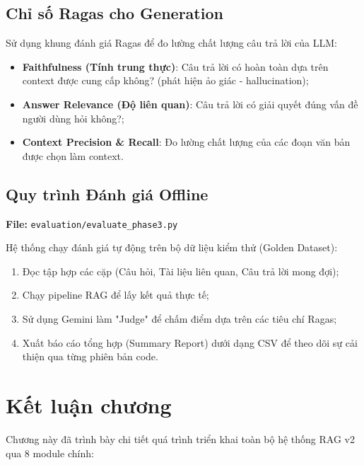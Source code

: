\documentclass[../DoAn.tex]{subfiles}
\begin{document}
\subsection{Chỉ số Ragas cho Generation}
Sử dụng khung đánh giá Ragas để đo lường chất lượng câu trả lời của LLM:
\begin{itemize}
    \item \textbf{Faithfulness (Tính trung thực)}: Câu trả lời có hoàn toàn dựa trên context được cung cấp không? (phát hiện ảo giác - hallucination);
    \item \textbf{Answer Relevance (Độ liên quan)}: Câu trả lời có giải quyết đúng vấn đề người dùng hỏi không?;
    \item \textbf{Context Precision \& Recall}: Đo lường chất lượng của các đoạn văn bản được chọn làm context.
\end{itemize}

\subsection{Quy trình Đánh giá Offline}
\textbf{File:} \texttt{evaluation/evaluate_phase3.py}

Hệ thống chạy đánh giá tự động trên bộ dữ liệu kiểm thử (Golden Dataset):
\begin{enumerate}
    \item Đọc tập hợp các cặp (Câu hỏi, Tài liệu liên quan, Câu trả lời mong đợi);
    \item Chạy pipeline RAG để lấy kết quả thực tế;
    \item Sử dụng Gemini làm "Judge" để chấm điểm dựa trên các tiêu chí Ragas;
    \item Xuất báo cáo tổng hợp (Summary Report) dưới dạng CSV để theo dõi sự cải thiện qua từng phiên bản code.
\end{enumerate}

\section{Kết luận chương}
Chương này đã trình bày chi tiết quá trình triển khai toàn bộ hệ thống RAG v2 qua 8 module chính:
\end{document}

